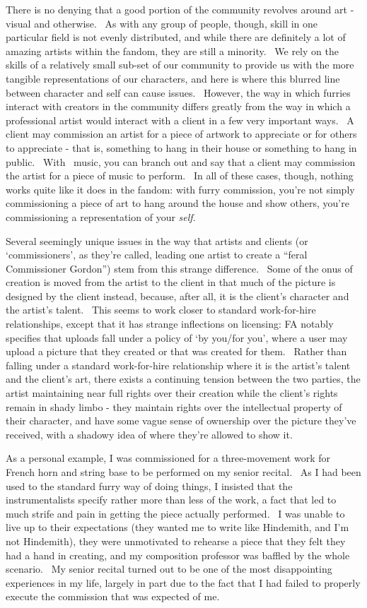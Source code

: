 There is no denying that a good portion of the community revolves around
art - visual and otherwise. ~As with any group of people, though, skill
in one particular field is not evenly distributed, and while there are
definitely a lot of amazing artists within the fandom, they are still a
minority. ~We rely on the skills of a relatively small sub-set of our
community to provide us with the more tangible representations of our
characters, and here is where this blurred line between character and
self can cause issues. ~However, the way in which furries interact with
creators in the community differs greatly from the way in which a
professional artist would interact with a client in a few very important
ways. ~A client may commission an artist for a piece of artwork to
appreciate or for others to appreciate - that is, something to hang in
their house or something to hang in public. ~With ~music, you can branch
out and say that a client may commission the artist for a piece of music
to perform. ~In all of these cases, though, nothing works quite like it
does in the fandom: with furry commission, you're not simply
commissioning a piece of art to hang around the house and show others,
you're commissioning a representation of your \emph{self}.

Several seemingly unique issues in the way that artists and clients (or
`commissioners', as they're called, leading one artist to create a
``feral Commissioner Gordon'') stem from this strange difference. ~Some
of the onus of creation is moved from the artist to the client in that
much of the picture is designed by the client instead, because, after
all, it is the client's character and the artist's talent. ~This seems
to work closer to standard work-for-hire relationships, except that it
has strange inflections on licensing: FA notably specifies that uploads
fall under a policy of `by you/for you', where a user may upload a
picture that they created or that was created for them. ~Rather than
falling under a standard work-for-hire relationship where it is the
artist's talent and the client's art, there exists a continuing tension
between the two parties, the artist maintaining near full rights over
their creation while the client's rights remain in shady limbo - they
maintain rights over the intellectual property of their character, and
have some vague sense of ownership over the picture they've received,
with a shadowy idea of where they're allowed to show it.

As a personal example, I was commissioned for a three-movement work for
French horn and string base to be performed on my senior recital. ~As I
had been used to the standard furry way of doing things, I insisted that
the instrumentalists specify rather more than less of the work, a fact
that led to much strife and pain in getting the piece actually
performed. ~I was unable to live up to their expectations (they wanted
me to write like Hindemith, and I'm not Hindemith), they were
unmotivated to rehearse a piece that they felt they had a hand in
creating, and my composition professor was baffled by the whole
scenario. ~My senior recital turned out to be one of the most
disappointing experiences in my life, largely in part due to the fact
that I had failed to properly execute the commission that was expected
of me.

